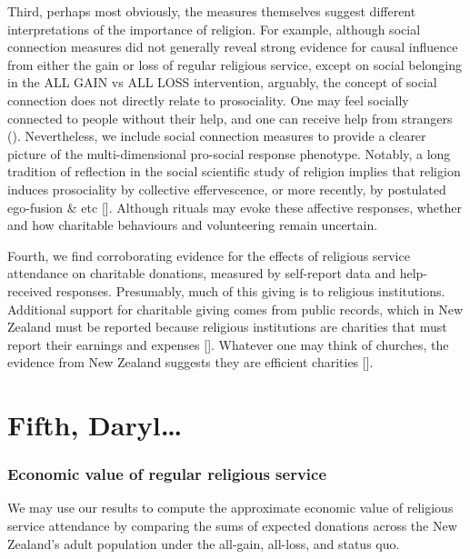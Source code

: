 \documentclass[
  single column]{article}
\begin{document}
Third, perhaps most obviously, the measures themselves suggest different
interpretations of the importance of religion. For example, although
social connection measures did not generally reveal strong evidence for
causal influence from either the gain or loss of regular religious
service, except on social belonging in the ALL GAIN vs ALL LOSS
intervention, arguably, the concept of social connection does not
directly relate to prosociality. One may feel socially connected to
people without their help, and one can receive help from strangers
(). Nevertheless,
we include social connection measures to provide a clearer picture of
the multi-dimensional pro-social response phenotype. Notably, a long
tradition of reflection in the social scientific study of religion
implies that religion induces prosociality by collective effervescence,
or more recently, by postulated ego-fusion \& etc {[}{]}. Although
rituals may evoke these affective responses, whether and how charitable
behaviours and volunteering remain uncertain.

Fourth, we find corroborating evidence for the effects of religious
service attendance on charitable donations, measured by self-report data
and help-received responses. Presumably, much of this giving is to
religious institutions. Additional support for charitable giving comes
from public records, which in New Zealand must be reported because
religious institutions are charities that must report their earnings and
expenses {[}{]}. Whatever one may think of churches, the evidence from
New Zealand suggests they are efficient charities {[}{]}.

\section{Fifth, Daryl\ldots{}}\label{fifth-daryl}

\subsubsection{Economic value of regular religious
service}\label{economic-value-of-regular-religious-service}

We may use our results to compute the approximate economic value of
religious service attendance by comparing the sums of expected donations
across the New Zealand's adult population under the all-gain, all-loss,
and status quo.
\end{document}
